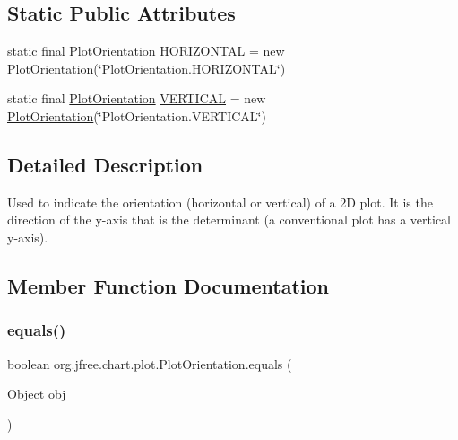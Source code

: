 \subsection*{Static Public Attributes}
\begin{DoxyCompactItemize}
\item 
static final \mbox{\hyperlink{classorg_1_1jfree_1_1chart_1_1plot_1_1_plot_orientation}{Plot\+Orientation}} \mbox{\hyperlink{classorg_1_1jfree_1_1chart_1_1plot_1_1_plot_orientation_a79919b3737e371f37b1267b11fd7c4e1}{H\+O\+R\+I\+Z\+O\+N\+T\+AL}} = new \mbox{\hyperlink{classorg_1_1jfree_1_1chart_1_1plot_1_1_plot_orientation}{Plot\+Orientation}}(\char`\"{}Plot\+Orientation.\+H\+O\+R\+I\+Z\+O\+N\+T\+AL\char`\"{})
\item 
static final \mbox{\hyperlink{classorg_1_1jfree_1_1chart_1_1plot_1_1_plot_orientation}{Plot\+Orientation}} \mbox{\hyperlink{classorg_1_1jfree_1_1chart_1_1plot_1_1_plot_orientation_a2b064227b679130eb0b5e3ac022e5371}{V\+E\+R\+T\+I\+C\+AL}} = new \mbox{\hyperlink{classorg_1_1jfree_1_1chart_1_1plot_1_1_plot_orientation}{Plot\+Orientation}}(\char`\"{}Plot\+Orientation.\+V\+E\+R\+T\+I\+C\+AL\char`\"{})
\end{DoxyCompactItemize}


\subsection{Detailed Description}
Used to indicate the orientation (horizontal or vertical) of a 2D plot. It is the direction of the y-\/axis that is the determinant (a conventional plot has a vertical y-\/axis). 

\subsection{Member Function Documentation}
\mbox{\label{classorg_1_1jfree_1_1chart_1_1plot_1_1_plot_orientation_accc26c2333ee0c23eb94e5fde0a95f72}} 
\subsubsection{\texorpdfstring{equals()}{equals()}}
{\footnotesize\ttfamily boolean org.\+jfree.\+chart.\+plot.\+Plot\+Orientation.\+equals (\begin{DoxyParamCaption}\item[{Object}]{obj }\end{DoxyParamCaption})}

